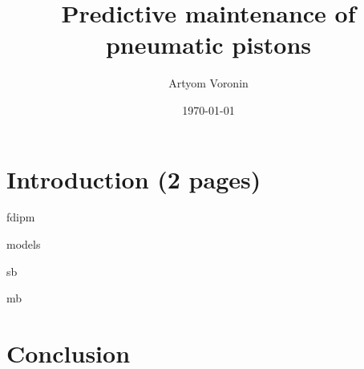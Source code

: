 \documentclass[11pt]{article}
\title{Predictive maintenance of pneumatic pistons}
\author{Artyom Voronin}
\date{\today}
\begin{document}
\maketitle	
\tableofcontents

\pagebreak
\section{Introduction (2 pages)}
\pagebreak

{fdipm}
\pagebreak

{models}
\pagebreak

{sb}
\pagebreak

{mb}
\pagebreak

\section{Conclusion}
%
\end{document}
